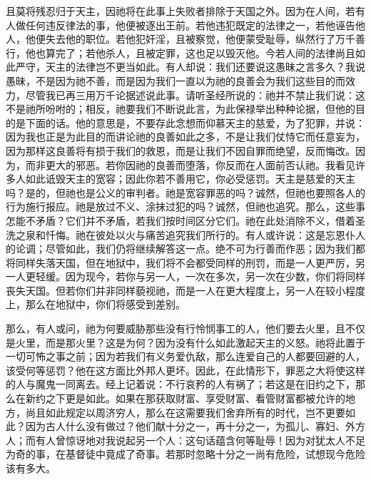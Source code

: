 且莫将残忍归于天主，因祂将在此事上失败者排除于天国之外。因为在人间，若有人做任何违反律法的事，他便被逐出王前。若他违犯既定的法律之一，若他诬告他人，他便失去他的职位。若他犯奸淫，且被察觉，他便蒙受耻辱，纵然行了万千善行，他也算完了；若他杀人，且被定罪，这也足以毁灭他。今若人间的法律尚且如此严守，天主的法律岂不更当如此。有人却说：我们还要说这愚昧之言多久？我说愚昧，不是因为祂不善，而是因为我们一直以为祂的良善会为我们这些目的而效力，尽管我已再三用万千论据述说此事。请听圣经所说的：祂并不禁止我们说：这不是祂所吩咐的；相反，祂要我们不断说此言，为此保禄举出种种论据，但他的目的是下面的话。他的意思是，不要存此念想而仰慕天主的慈爱，为了犯罪，并说：因为我也正是为此目的而讲论祂的良善如此之多，不是让我们仗恃它而任意妄为，因为那样这良善将有损于我们的救恩，而是让我们不因自罪而绝望，反而悔改。因为，而非更大的邪恶。若你因祂的良善而堕落，你反而在人面前否认祂。我看见许多人如此诋毁天主的宽容；因此你若不善用它，你必受惩罚。天主是慈爱的天主吗？是的，但祂也是公义的审判者。祂是宽容罪恶的吗？诚然，但祂也要照各人的行为施行报应。祂是放过不义、涂抹过犯的吗？诚然，但祂也追究。那么，这些事怎能不矛盾？它们并不矛盾，若我们按时间区分它们。祂在此处消除不义，借着圣洗之泉和忏悔。祂在彼处以火与痛苦追究我们所行的。有人或许说：这是忘恩仆人的论调；尽管如此，我们仍将继续解答这一点。绝不可为行善而作恶；因为我们都将同样失落天国，但在地狱中，我们将不会都受同样的刑罚，而是一人更严厉，另一人更轻缓。因为现今，若你与另一人，一次在多次，另一次在少数，你们将同样丧失天国。但若你们并非同样藐视祂，而是一人在更大程度上，另一人在较小程度上，那么在地狱中，你们将感受到差别。\par

那么，有人或问，祂为何要威胁那些没有行怜悯事工的人，他们要去火里，且不仅是火里，而是那火里？这是为何？因为没有什么如此激起天主的义怒。祂将此置于一切可怖之事之前；因为若我们有义务爱仇敌，那么连爱自己的人都要回避的人，该受何等惩罚？他在这方面比外邦人更坏。因此，在此情形下，罪恶之大将使这样的人与魔鬼一同离去。经上记着说：不行哀矜的人有祸了；若这是在旧约之下，那么在新约之下更是如此。如果在那获取财富、享受财富、看管财富都被允许的地方，尚且如此规定以周济穷人，那么在这需要我们舍弃所有的时代，岂不更要如此？因为古人什么没有做过？他们献十分之一，再十分之一，为孤儿、寡妇、外方人；而有人曾惊讶地对我说起另一个人：这句话蕴含何等耻辱！因为对犹太人不足为奇的事，在基督徒中竟成了奇事。若那时忽略十分之一尚有危险，试想现今危险该有多大。\par

